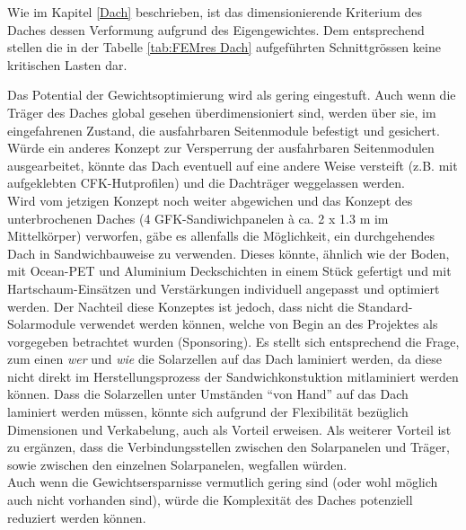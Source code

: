 Wie im Kapitel \ref{Dach} beschrieben, ist das dimensionierende Kriterium des Daches dessen Verformung aufgrund des Eigengewichtes. Dem entsprechend stellen die in der Tabelle \ref{tab:FEMres Dach} aufgeführten Schnittgrössen keine kritischen Lasten dar.

Das Potential der Gewichtsoptimierung wird als gering eingestuft. Auch wenn die Träger des Daches global gesehen überdimensioniert sind, werden über sie, im eingefahrenen Zustand, die ausfahrbaren Seitenmodule befestigt und gesichert. Würde ein anderes Konzept zur Versperrung der ausfahrbaren Seitenmodulen ausgearbeitet, könnte das Dach eventuell auf eine andere Weise versteift (z.B. mit aufgeklebten CFK-Hutprofilen) und die Dachträger weggelassen werden.\\
Wird vom jetzigen Konzept noch weiter abgewichen und das Konzept des unterbrochenen Daches (4 GFK-Sandiwichpanelen à ca. 2 x 1.3 m im Mittelkörper) verworfen, gäbe es allenfalls die Möglichkeit, ein durchgehendes Dach in Sandwichbauweise zu verwenden. Dieses könnte, ähnlich wie der Boden, mit Ocean-PET und Aluminium Deckschichten in einem Stück gefertigt und mit Hartschaum-Einsätzen und Verstärkungen individuell angepasst und optimiert werden. Der Nachteil diese Konzeptes ist jedoch, dass nicht die Standard-Solarmodule verwendet werden können, welche von Begin an des Projektes als vorgegeben betrachtet wurden (Sponsoring). Es stellt sich entsprechend die Frage, zum einen \emph{wer} und \emph{wie} die Solarzellen auf das Dach laminiert werden, da diese nicht direkt im Herstellungsprozess der Sandwichkonstuktion mitlaminiert werden können. Dass die Solarzellen unter Umständen ``von Hand'' auf das Dach laminiert werden müssen, könnte sich aufgrund der Flexibilität bezüglich Dimensionen und Verkabelung, auch als Vorteil erweisen. Als weiterer Vorteil ist zu ergänzen, dass die Verbindungsstellen zwischen den Solarpanelen und Träger, sowie zwischen den einzelnen Solarpanelen, wegfallen würden.\\
Auch wenn die Gewichtsersparnisse vermutlich gering sind (oder wohl möglich auch nicht vorhanden sind), würde die Komplexität des Daches potenziell reduziert werden können.




